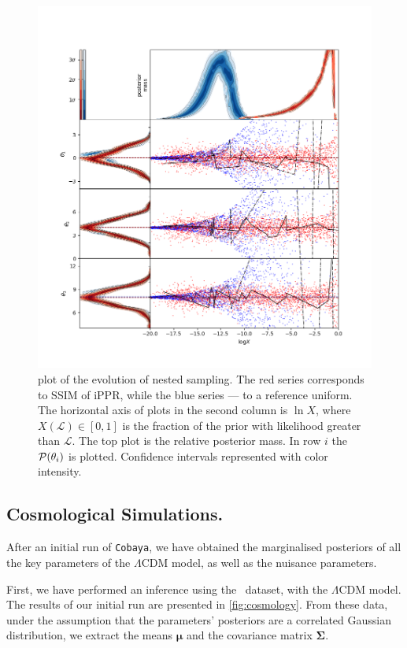 \documentclass[usenatbib]{mnras}
\begin{document}
\begin{figure}
\includegraphics[width=.9\textwidth]{./illustrations/higson.png}
\caption{plot of the evolution of nested sampling. The \color{red} red
  \color{black} series corresponds to SSIM of iPPR, while the
  \color{blue} blue \color{black} series --- to a reference
  uniform. The horizontal axis of plots in the second column is
  \(\ln X\), where \(X(\mathcal{L}) \in [0,1]\) is the fraction of the
  prior with likelihood greater than \(\mathcal{L}\). The top plot is
  the relative posterior mass. In row $i$ the ${\cal P}(\theta_{i})$
  is plotted. Confidence intervals represented with color
  intensity. \label{fig:higson}}
\end{figure}




\subsection{Cosmological Simulations.}\label{sec:orgb81c159}
After an initial run of \texttt{Cobaya}, we have obtained the marginalised
posteriors of all the key parameters of the \(\Lambda\)CDM model,
as well as the nuisance parameters.

First, we have performed an inference using the~\cite{Planck} dataset,
with the \(\Lambda\)CDM model. The results of our initial run are
presented in \cref{fig:cosmology}. From these data, under the
assumption that the parameters' posteriors are a correlated Gaussian
distribution, we extract the means $\bm{\mu}$ and the covariance
matrix \(\bm{\Sigma}\).
\end{document}
